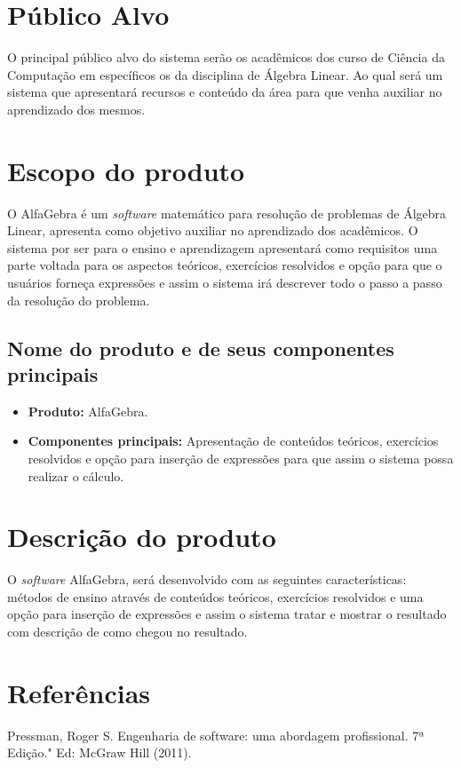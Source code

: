\documentclass{scrreprt}
\begin{document}
\section{Público Alvo}
O principal público alvo do sistema serão os acadêmicos dos curso de Ciência da Computação em específicos os da disciplina de Álgebra Linear. Ao qual será um sistema que apresentará recursos e conteúdo da área para que venha auxiliar no aprendizado dos mesmos.

\section{Escopo do produto}
O AlfaGebra é um \textit{software} matemático para resolução de problemas de Álgebra Linear, apresenta como objetivo auxiliar no aprendizado dos acadêmicos. O sistema por ser para o ensino e aprendizagem apresentará como requisitos uma parte voltada para os aspectos teóricos, exercícios resolvidos e opção para que o usuários forneça expressões e assim o sistema irá descrever todo o passo a passo da resolução do problema.

\subsection{Nome do produto e de seus componentes principais}
\begin{itemize}
    \item \textbf{Produto: }AlfaGebra.
    \item \textbf{Componentes principais: }Apresentação de conteúdos teóricos, exercícios resolvidos e opção para inserção de expressões para que assim o sistema possa realizar o cálculo.
\end{itemize}

\section{Descrição do produto}
O \textit{software} AlfaGebra, será desenvolvido com as seguintes características: métodos de ensino através de conteúdos teóricos, exercícios resolvidos e uma opção para inserção de expressões e assim o sistema tratar e mostrar o resultado com descrição de como chegou no resultado. 

\section{Referências}
Pressman, Roger S. Engenharia de software: uma abordagem profissional. 7ª Edição." Ed: McGraw Hill (2011).\newline
\end{document}
